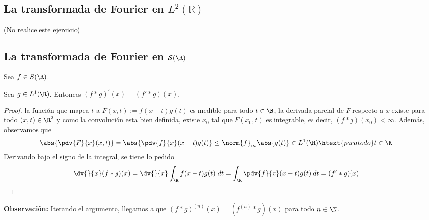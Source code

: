 \documentclass{article}
\begin{document}
\begin{enumerate}
\begin{enumerate}
    \end{enumerate}
\end{enumerate}

\newpage
\subsection{La transformada de Fourier en \texorpdfstring{$L^{2}(\mathbb{R})$}{}}
\noindent (No realice este ejercicio)

\newpage
\subsection{La transformada de Fourier en \texorpdfstring{$\mathcal{S}(\R)$}{}}
\noindent Sea $f\in S(\R)$.
\begin{lema}
    Sea $g\in L^{1}(\R)$. Entonces $(f*g)^{'}(x)=(f'*g)(x)$.
\end{lema}
\begin{proof}
    la función que mapea $t$ a $F(x,t):=f(x-t)g(t)$ es medible para todo $t\in\R$, la derivada 
    parcial de $F$ respecto a $x$ existe para todo $(x,t)\in\R^{2}$ y como la convolución esta
    bien definida, existe $x_{0}$ tal que $F(x_{0},t)$ es integrable, es decir, 
    $(f*g)(x_{0})<\infty$. Además, observamos que
    \begin{equation*}
        \abs{\pdv{F}{x}(x,t)}=\abs{\pdv{f}{x}(x-t)g(t)}
        \leq\norm{f}_{\infty}\abs{g(t)}\in L^{1}(\R)
        \htext{para todo}t\in\R
    \end{equation*}
    Derivando bajo el signo de la integral, se tiene lo pedido
    \begin{equation*}
        \dv{}{x}(f*g)(x)=\dv{}{x}\int_{\R}f(x-t)g(t)\hspace{1mm}dt
        =\int_{\R}\pdv{f}{x}(x-t)g(t)\hspace{1mm}dt=(f'*g)(x)
    \end{equation*}
\end{proof}

\noindent\textbf{Observación:} Iterando el argumento, llegamos a que 
$(f*g)^{(n)}(x)=(f^{(n)}*g)(x)$ para todo $n\in\N$.
\end{document}

